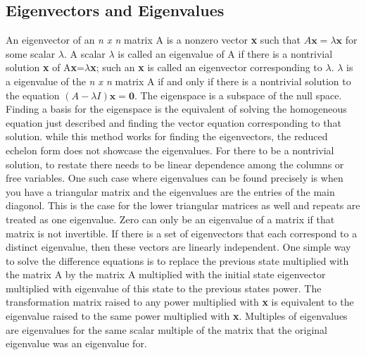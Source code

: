 \documentclass[12pt]{article}
\begin{document}
\subsection{Eigenvectors and Eigenvalues}
An eigenvector of an \textit{n x n} matrix A is a nonzero vector \textbf{x} such that $A\mathbf{x}=\lambda\mathbf{x}$ for some scalar $\lambda$. A scalar $\lambda$ is called an eigenvalue of 
A if there is a nontrivial solution \textbf{x} of A\textbf{x}=$\lambda$\textbf{x}; such an \textbf{x} is called an eigenvector corresponding to $\lambda$. $\lambda$ is a eigenvalue of 
the \textit{n x n} matrix A if and only if there is a nontrivial solution to the equation $(A-\lambda I)\mathbf{x=0}$. The eigenspace is a subspace of the null space. Finding a basis for 
the eigenspace is the equivalent of solving the homogeneous equation just described and finding the vector equation corresponding to that solution. while this method works for finding the 
eigenvectors, the reduced echelon form does not showcase the eigenvalues. For there to be a nontrivial solution, to restate there needs to be linear dependence among the columns or free 
variables. One such case where eigenvalues can be found precisely is when you have a triangular matrix and the eigenvalues are the entries of the main diagonol. This is the 
case for the lower triangular matrices as well and repeats are treated as one eigenvalue. Zero can only be an eigenvalue of a matrix if that matrix is not invertible. If there is a set 
of eigenvectors that each correspond to a distinct eigenvalue, then these vectors are linearly independent. One simple way to solve the difference equations is to replace the 
previous state multiplied with the matrix A by the matrix A multiplied with the initial state eigenvector multiplied with eigenvalue of this state to the previous states power. The 
transformation matrix raised to any power multiplied with \textbf{x} is equivalent to the eigenvalue raised to the same power multiplied with \textbf{x}. Multiples of eigenvalues are 
eigenvalues for the same scalar multiple of the matrix that the original eigenvalue was an eigenvalue for. 
\end{document}
